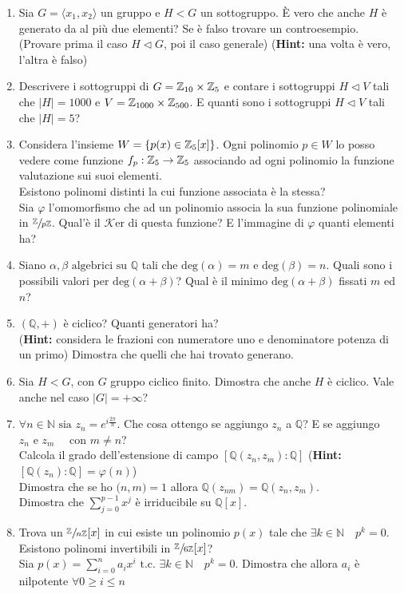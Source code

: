 \documentclass[a4paper,NoNotes]{stdmdoc}
\newcommand{\su}[2]{\sfrac{#1}{#2}}
\newcommand{\QQ}{\mathbb{Q}}
\newcommand{\NN}{\mathbb{N}}
\newcommand{\cart}{\times}
\newcommand{\gen}[1]{\langle #1 \rangle}
\newcommand{\tc}{\mbox{ t.c. }}
\newcommand{\Zp}{\su{\mathbb{Z}}{p\mathbb{Z}}}
\newcommand{\Hint}{{\bf Hint: }}
\newcommand{\Ker}{\mathcal{K}\mbox{er} }
\newcommand{\degree}{\mbox{deg}}
\newcommand{\MCD}[2]{\mathcal{(} #1 \mathcal{,} #2 \mathcal{)}}
\begin{document}
\begin{enumerate}
		\item Sia $G = \gen{x_1, x_2}$ un gruppo e $H < G$ un sottogruppo. \`E vero che anche $H$ \`e generato da al pi\`u due elementi? Se \`e falso trovare un controesempio. (Provare prima il caso $H \lhd G$, poi il caso generale) (\Hint una volta \`e vero, l'altra \`e falso)
		\item Descrivere i sottogruppi di $G = \ZZ{10}\cart\ZZ{5}$ e contare i sottogruppi $H \lhd V$ tali che $\mid H \mid = 1000$ e $V = \ZZ{1000}\cart\ZZ{500}$. E quanti sono i sottogruppi $H \lhd V$ tali che $\mid H \mid = 5$?
		\item Considera l'insieme $W = \left\{ p(x) \in \ZZ{5} [x] \right\}$. Ogni polinomio $p \in W$ lo posso vedere come funzione $f_p: \ZZ{5} \rightarrow \ZZ{5}$ associando ad ogni polinomio la funzione valutazione sui suoi elementi. \\ Esistono polinomi distinti la cui funzione associata \`e la stessa? \\ Sia $\varphi$ l'omomorfismo che ad un polinomio associa la sua funzione polinomiale in $\Zp$. Qual'\`e il $\Ker$ di questa funzione? E l'immagine di $\varphi$ quanti elementi ha?
		\item Siano $\alpha, \beta \mbox{ algebrici su } \QQ$ tali che $\degree(\alpha) = m$ e $\degree(\beta) = n$. Quali sono i possibili valori per $\degree(\alpha + \beta)$? Qual \`e il minimo $\degree(\alpha + \beta)$ fissati $m$ ed $n$?
		\item $(\QQ, +)$ \`e ciclico? Quanti generatori ha? \\ (\Hint considera le frazioni con numeratore uno e denominatore potenza di un primo) Dimostra che quelli che hai trovato generano.
		\item Sia $H < G$, con $G$ gruppo ciclico finito. Dimostra che anche $H$ \`e ciclico. Vale anche nel caso $\mid G \mid = +\infty$?
		\item $\forall n \in \NN \mbox{ sia } z_n = e^{i\frac{2\pi}{n}}$. Che cosa ottengo se aggiungo $z_n$ a $\QQ$? E se aggiungo $z_n \mbox{ e } z_m \quad \mbox{ con } m \neq n$? \\ Calcola il grado dell'estensione di campo $\left[ \QQ (z_n, z_m) : \QQ \right]$ (\Hint $\left[ \QQ(z_n) : \QQ \right] = \varphi(n)$) \\ Dimostra che se ho $\MCD{n}{m} = 1$ allora $\QQ(z_{nm}) = \QQ(z_n, z_m)$. \\ Dimostra che $\sum_{j=0}^{p-1} x^j$ \`e irriducibile su $\QQ[x]$.
		\item Trova un $\su{\ZZ{}}{n\ZZ{}}[x]$ in cui esiste un polinomio $p(x)$ tale che $\exists k \in \NN \quad p^k = 0$. Esistono polinomi invertibili in $\su{\ZZ{}}{6\ZZ{}}[x]$? \\ Sia $p(x) = \sum_{i=0}^{n} a_i x^i \tc \exists k \in \NN \quad p^k=0$. Dimostra che allora $a_i$ \`e nilpotente $\forall 0 \ge i \le n$

\end{enumerate}
\end{document}
